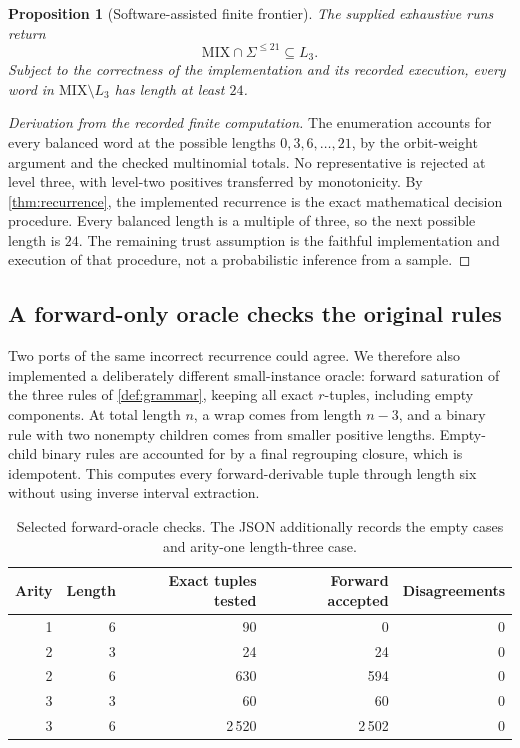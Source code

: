 \documentclass[11pt,letterpaper]{article}
\numberwithin{equation}{section}
\newtheorem{proposition}[theorem]{Proposition}
\theoremstyle{definition}
\theoremstyle{remark}
\newcommand{\Mix}{\mathrm{MIX}}
\begin{document}
\begin{proposition}[Software-assisted finite frontier]
\label{prop:frontier}
The supplied exhaustive runs return
\[
 \Mix\cap\Sigma^{\leq21}\subseteq L_3.
\]
Subject to the correctness of the implementation and its recorded
execution, every word in \(\Mix\setminus L_3\) has length at least
\(24\).
\end{proposition}
\begin{proof}[Derivation from the recorded finite computation]
The enumeration accounts for every balanced word at the possible
lengths \(0,3,6,\ldots,21\), by the orbit-weight argument and the
checked multinomial totals. No representative is rejected at level
three, with level-two positives transferred by monotonicity.
By \cref{thm:recurrence}, the implemented recurrence is the exact
mathematical decision procedure. Every balanced length is a multiple
of three, so the next possible length is \(24\). The remaining trust
assumption is the faithful implementation and execution of that
procedure, not a probabilistic inference from a sample.
\end{proof}

\subsection{A forward-only oracle checks the original rules}
Two ports of the same incorrect recurrence could agree. We therefore
also implemented a deliberately different small-instance oracle:
forward saturation of the three rules of \cref{def:grammar}, keeping
all exact \(r\)-tuples, including empty components. At total length
\(n\), a wrap comes from length \(n-3\), and a binary rule with two
nonempty children comes from smaller positive lengths. Empty-child
binary rules are accounted for by a final regrouping closure, which
is idempotent. This computes every forward-derivable tuple through
length six without using inverse interval extraction.

\begin{table}[htbp]
\centering
\begin{tabular}{rrrrr}
\toprule
Arity & Length & Exact tuples tested & Forward accepted & Disagreements\\
\midrule
1 & 6 & 90    & 0     & 0\\
2 & 3 & 24    & 24    & 0\\
2 & 6 & 630   & 594   & 0\\
3 & 3 & 60    & 60    & 0\\
3 & 6 & 2\,520 & 2\,502 & 0\\
\bottomrule
\end{tabular}
\caption{Selected forward-oracle checks. The JSON additionally records
the empty cases and arity-one length-three case.}
\label{tab:oracle}
\end{table}
\end{document}
